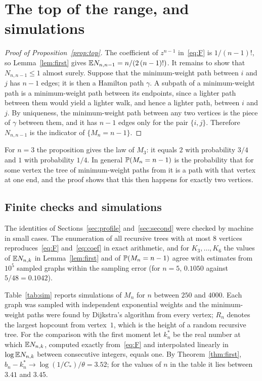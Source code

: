 \section{The top of the range, and simulations}\label{sec:top}

\begin{proof}[Proof of Proposition~\ref{prop:top}]
The coefficient of $z^{n-1}$ in~\eqref{eq:F} is $1/(n-1)!$, so Lemma~\ref{lem:first} gives
$\mathbb{E} N_{n,n-1}=n/(2\,(n-1)!)$. It remains to show that $N_{n,n-1}\le1$ almost surely. Suppose that the
minimum-weight path between $i$ and $j$ has $n-1$ edges; it is then a Hamilton path $\gamma$. A subpath of a
minimum-weight path is a minimum-weight path between its endpoints, since a lighter path between them would yield a
lighter walk, and hence a lighter path, between $i$ and $j$. By uniqueness, the minimum-weight path between any two
vertices is the piece of $\gamma$ between them, and it has $n-1$ edges only for the pair $\{i,j\}$. Therefore
$N_{n,n-1}$ is the indicator of $\{M_n=n-1\}$.
\end{proof}

For $n=3$ the proposition gives the law of $M_3$: it equals $2$ with probability $3/4$ and $1$ with probability
$1/4$. In general $\mathbb{P}(M_n=n-1)$ is the probability that for some vertex the tree of minimum-weight paths from it
is a path with that vertex at one end, and the proof shows that this then happens for exactly two vertices.

\subsection*{Finite checks and simulations}
The identities of Sections~\ref{sec:profile} and~\ref{sec:second} were checked by machine in small cases. The
enumeration of all recursive trees with at most $8$ vertices reproduces~\eqref{eq:F} and~\eqref{eq:coef} in exact
arithmetic, and for $K_3,\dots,K_6$ the values of $\mathbb{E} N_{n,k}$ in Lemma~\ref{lem:first} and of $\mathbb{P}(M_n=n-1)$
agree with estimates from $10^5$ sampled graphs within the sampling error (for $n=5$, $0.1050$ against $5/48=0.1042$).

Table~\ref{tab:sim} reports simulations of $M_n$ for $n$ between $250$ and $4000$. Each graph was sampled with
independent exponential weights and the minimum-weight paths were found by Dijkstra's algorithm from every vertex;
$R_n$ denotes the largest hopcount from vertex~$1$, which is the height of a random recursive tree. For the
comparison with the first moment let $k^*_n$ be the real number at which $\mathbb{E} N_{n,k}$, computed exactly
from~\eqref{eq:F} and interpolated linearly in $\log\mathbb{E} N_{n,k}$ between consecutive integers, equals one. By
Theorem~\ref{thm:first}, $b_n-k^*_n\to\log(1/C_*)/\theta=3.52$; for the values of $n$ in the table it lies between
$3.41$ and $3.45$.

